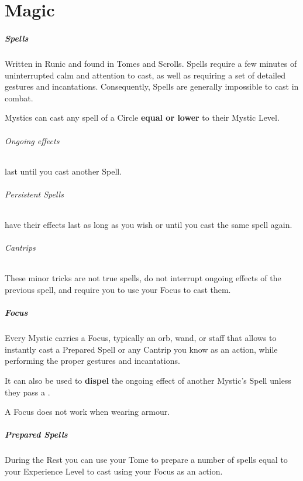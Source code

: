 \documentclass[itdr]{subfiles}
\begin{document}
\chapter{Magic}

\paragraph{Spells}
Written in Runic and found in Tomes and Scrolls. Spells require a few minutes of uninterrupted calm and attention to cast, as well as requiring a set of detailed gestures and incantations. Consequently, Spells are generally impossible to cast in combat.

Mystics can cast any spell of a Circle \textbf{equal or lower} to their Mystic Level.

\subparagraph{Ongoing effects} last until you cast another Spell.

\subparagraph{Persistent Spells} have their effects last as long as you wish or until you cast the same spell again.

\subparagraph{Cantrips}
These minor tricks are not true spells, do not interrupt ongoing effects of the previous spell, and require you to use your Focus to cast them.

\vfill
{}
\paragraph{Focus}
Every Mystic carries a Focus, typically an orb, wand, or staff that allows to instantly cast a Prepared Spell or any Cantrip you know as an action, while performing the proper gestures and incantations.

It can also be used to \textbf{dispel} the ongoing effect of another Mystic's Spell unless they pass a .

A Focus does not work when wearing armour.

\vfill
{}
\paragraph{Prepared Spells}
During the Rest you can use your Tome to prepare a number of spells equal to your Experience Level to cast using your Focus as an action.
\end{document}

